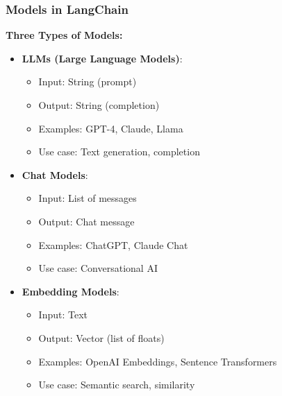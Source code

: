 \begin{frame}\frametitle{Models in LangChain}

\textbf{Three Types of Models:}

\begin{itemize}
\item \textbf{LLMs (Large Language Models)}:
    \begin{itemize}
    \item Input: String (prompt)
    \item Output: String (completion)
    \item Examples: GPT-4, Claude, Llama
    \item Use case: Text generation, completion
    \end{itemize}

\item \textbf{Chat Models}:
    \begin{itemize}
    \item Input: List of messages
    \item Output: Chat message
    \item Examples: ChatGPT, Claude Chat
    \item Use case: Conversational AI
    \end{itemize}

\item \textbf{Embedding Models}:
    \begin{itemize}
    \item Input: Text
    \item Output: Vector (list of floats)
    \item Examples: OpenAI Embeddings, Sentence Transformers
    \item Use case: Semantic search, similarity
    \end{itemize}
\end{itemize}

\end{frame}


